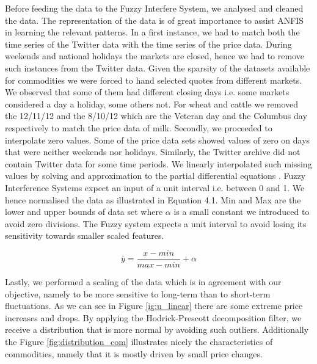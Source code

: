 Before feeding the data to the Fuzzy Interfere System, we analysed and cleaned the data. The representation of the data is of great importance to assist ANFIS in learning the relevant patterns. In a first instance, we had to match both the time series of the Twitter data with the time series of the price data. During weekends and national holidays the markets are closed, hence we had to remove such instances from the Twitter data. Given the sparsity of the datasets available for commodities we were forced to hand selected quotes from different markets. We observed that some of them had different closing days i.e. some markets considered a day a holiday, some others not. For wheat and cattle we removed the 12/11/12 and the 8/10/12 which are the Veteran day and the Columbus day respectively to match the price data of milk.  Secondly, we proceeded to interpolate zero values. Some of the price data sets showed values of zero on days that were neither weekends nor holidays. Similarly, the Twitter archive did not contain  Twitter data for some time periods. We linearly interpolated such missing values by solving and approximation to the partial differential equations \cite{john2012}.  Fuzzy Interference Systems expect an input of a unit interval i.e. between 0 and 1. We hence normalised the data as illustrated in Equation 4.1. Min and Max are the lower and upper bounds of data set where $\alpha$ is a small constant we introduced to avoid zero divisions. The Fuzzy system expects a unit interval to avoid losing its sensitivity towards smaller scaled features. 

\begin{equation} \label{eq:solve}
\overline{ y } = \frac{x - min}{max - min}  + \alpha \end{equation}


Lastly, we performed a scaling of the data which is in agreement with our objective, namely to be more sensitive to long-term than to short-term fluctuations. As we can see in Figure \ref{ig:u_linear} there are some extreme price increases and drops. By applying the Hodrick-Prescott decomposition \cite{edward81} filter, we receive a distribution that is more normal by avoiding such outliers. Additionally the Figure \ref{fig:distribution_com} illustrates nicely the characteristics of commodities, namely that it is mostly driven by small price changes. 






